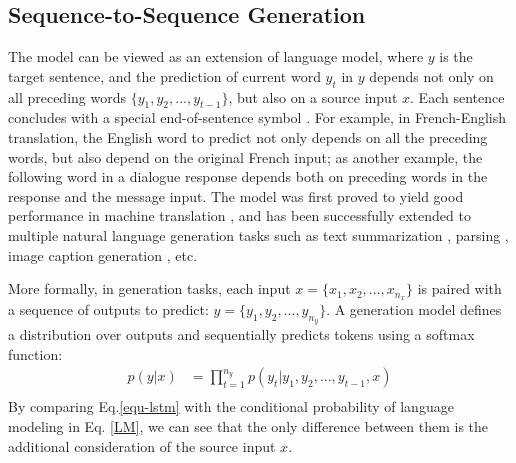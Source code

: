 \subsection{Sequence-to-Sequence Generation}
The \sts model can be viewed as an extension of language model, 
where $y$ is the target sentence, and the  
 prediction of current word $y_t$ in $y$
depends not only on all preceding words $\{y_1, y_2, ..., y_{t-1}\}$, but also on a source input $x$. 
Each sentence concludes with a special end-of-sentence symbol \eos. 
For example, in French-English translation, the English word to predict not only depends on all the preceding words, but also depend on the original French input; 
as another example, the following word in a dialogue response depends both on preceding words in the response and the  message input. 
The \sts model was first proved to yield good performance in machine translation \cite{sutskever2014sequence,bahdanau2014neural,cho2014learning,luong2015effective,luong2014addressing,luong2016achieving,sennrich2015neural,kim2016sequence,wiseman2016sequence,britz2017massive,wu2016google}, 
and has been successfully extended to multiple natural language generation tasks such as text summarization \cite{rush2015neural,see2017get,chopra2016abstractive,nallapati2016abstractive,zeng2016efficient},
parsing \cite{luong2015multi,vinyals2015grammar,jia2016data}, image caption generation \cite{chen2015mind,xu2015show,karpathy2015deep,mao2014deep}, etc. 

More formally, 
in \sts generation tasks, each input $x=\{x_1,x_2,...,x_{n_x}\}$ is paired with a sequence of outputs to predict: 
$y=\{y_1,y_2,...,y_{n_y}\}$. 
A  \sts generation model defines a distribution over outputs and sequentially predicts tokens using a softmax function:
\begin{equation}
\begin{aligned}
p(y|x)
&=\prod_{t=1}^{n_y}p(y_t|y_1,y_2,...,y_{t-1}, x)\\
\end{aligned}
\label{equ-lstm}
\end{equation}
By comparing Eq.\ref{equ-lstm} with the conditional probability of language modeling in Eq. \ref{LM}, we can see that the only difference between them is the additional consideration of the 
source input $x$.

